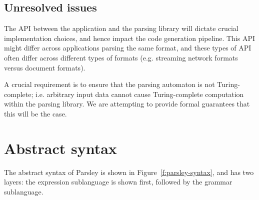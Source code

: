 \documentclass[letterpaper]{article}
\begin{document}
\subsection*{Unresolved issues}

The API between the application and the parsing library will dictate
crucial implementation choices, and hence impact the code generation
pipeline.  This API might differ across applications parsing the same
format, and these types of API often differ across different types of
formats (e.g. streaming network formats versus document formats).

A crucial requirement is to ensure that the parsing automaton is not
Turing-complete; i.e. arbitrary input data cannot cause
Turing-complete computation within the parsing library.  We are
attempting to provide formal guarantees that this will be the case.

\section{Abstract syntax}

The abstract syntax of Parsley is shown in
Figure~\ref{f:parsley-syntax}, and has two layers: the expression
sublanguage is shown first, followed by the grammar sublanguage.
\end{document}
